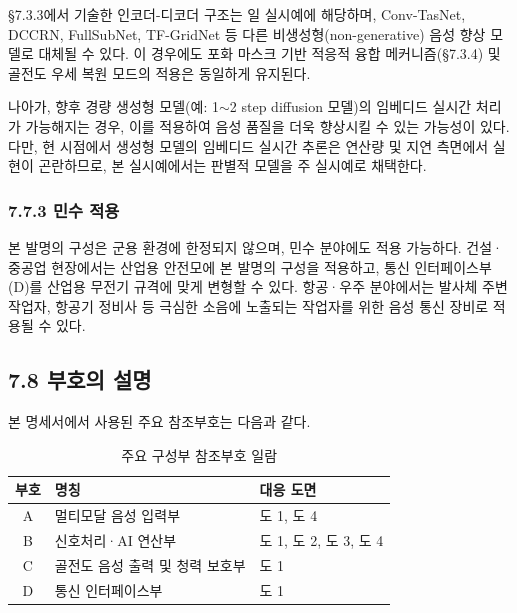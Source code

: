 \documentclass{article}
\begin{document}
§7.3.3에서 기술한 인코더-디코더 구조는 일 실시예에 해당하며, Conv-TasNet, DCCRN, FullSubNet, TF-GridNet 등 다른 비생성형(non-generative) 음성 향상 모델로 대체될 수 있다. 이 경우에도 포화 마스크 기반 적응적 융합 메커니즘(§7.3.4) 및 골전도 우세 복원 모드의 적용은 동일하게 유지된다.

나아가, 향후 경량 생성형 모델(예: 1$\sim$2 step diffusion 모델)의 임베디드 실시간 처리가 가능해지는 경우, 이를 적용하여 음성 품질을 더욱 향상시킬 수 있는 가능성이 있다. 다만, 현 시점에서 생성형 모델의 임베디드 실시간 추론은 연산량 및 지연 측면에서 실현이 곤란하므로, 본 실시예에서는 판별적 모델을 주 실시예로 채택한다.

\subsubsection{7.7.3 민수 적용}

본 발명의 구성은 군용 환경에 한정되지 않으며, 민수 분야에도 적용 가능하다. 건설·중공업 현장에서는 산업용 안전모에 본 발명의 구성을 적용하고, 통신 인터페이스부(D)를 산업용 무전기 규격에 맞게 변형할 수 있다. 항공·우주 분야에서는 발사체 주변 작업자, 항공기 정비사 등 극심한 소음에 노출되는 작업자를 위한 음성 통신 장비로 적용될 수 있다.

\subsection{7.8 부호의 설명}

본 명세서에서 사용된 주요 참조부호는 다음과 같다.

\begin{table}[H]
    \centering
    \renewcommand{\arraystretch}{1.2}
    \begin{tabular}{c|l|l}
        \hline
        \textbf{부호} & \textbf{명칭} & \textbf{대응 도면} \\
        \hline\hline
        A & 멀티모달 음성 입력부 & 도 1, 도 4 \\
        \hline
        B & 신호처리·AI 연산부 & 도 1, 도 2, 도 3, 도 4 \\
        \hline
        C & 골전도 음성 출력 및 청력 보호부 & 도 1 \\
        \hline
        D & 통신 인터페이스부 & 도 1 \\
        \hline
    \end{tabular}
    \caption{주요 구성부 참조부호 일람}
\end{table}

\end{document}
